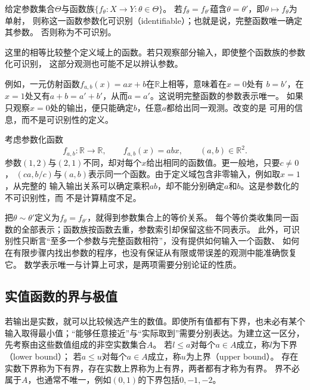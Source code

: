 \begin{definition}[函数参数化的可识别性]
\label{def:prelim-identifiable-parameterization}
给定参数集合$\Theta$与函数族$\{f_\theta:X\to Y:\theta\in\Theta\}$。
若$f_\theta=f_{\theta'}$蕴含$\theta=\theta'$，即$\theta\mapsto f_\theta$为单射，
则称这一函数参数化可识别（identifiable）；也就是说，完整函数唯一确定其参数。
否则称为不可识别。
\end{definition}
这里的相等比较整个定义域上的函数。若只观察部分输入，即使整个函数族的参数化可识别，
这部分观测也可能不足以辨认参数。

例如，一元仿射函数$f_{a,b}(x)=ax+b$在$\mathbb{R}$上相等，意味着在$x=0$处有
$b=b'$，在$x=1$处又有$a+b=a'+b'$，从而$a=a'$。这说明完整函数的参数表示唯一。
如果只观察$x=0$处的输出，便只能确定$b$，任意$a$都给出同一观测。改变的是
可用的信息，而不是可识别性的定义。

\begin{example}[参数不同而函数相同]
\label{ex:prelim-nonidentifiable-parameterization}
考虑参数化函数
\[
  f_{a,b}:\mathbb{R}\to\mathbb{R},
  \qquad
  f_{a,b}(x)=abx,
  \qquad
  (a,b)\in\mathbb{R}^2.
\]
参数$(1,2)$与$(2,1)$不同，却对每个$x$给出相同的函数值。更一般地，只要$c\neq0$，
$(ca,b/c)$与$(a,b)$表示同一个函数。由于定义域包含非零输入，例如取$x=1$，从完整的
输入输出关系可以确定乘积$ab$，却不能分别确定$a$和$b$。这是参数化的不可识别性，而
不是计算精度不足。
\end{example}

把$\theta\sim\theta'$定义为$f_\theta=f_{\theta'}$，就得到参数集合上的等价关系。
每个等价类收集同一函数的全部表示；函数族按函数去重，参数索引却保留这些不同表示。
此外，可识别性只断言“至多一个参数与完整函数相符”，没有提供如何输入一个函数、
如何在有限步骤内找出参数的程序，也没有保证从有限或带误差的观测中能准确恢复它。
数学表示唯一与计算上可求，是两项需要分别论证的性质。

\subsection{实值函数的界与极值}
\label{sec:prelim-optimal-values-errors}

若输出是实数，就可以比较候选产生的数值。即使所有值都有下界，也未必有某个输入取得最小值；“能够任意接近”与“实际取到”需要分别表达。为建立这一区分，先考察由这些数值组成的非空实数集合$A$。
若$l\leq a$对每个$a\in A$成立，称$l$为下界（lower bound）；
若$a\leq u$对每个$a\in A$成立，称$u$为上界（upper bound）。
存在实数下界称为下有界，存在实数上界称为上有界，两者都有才称为有界。
界不必属于$A$，也通常不唯一，例如$(0,1)$的下界包括$0,-1,-2$。

